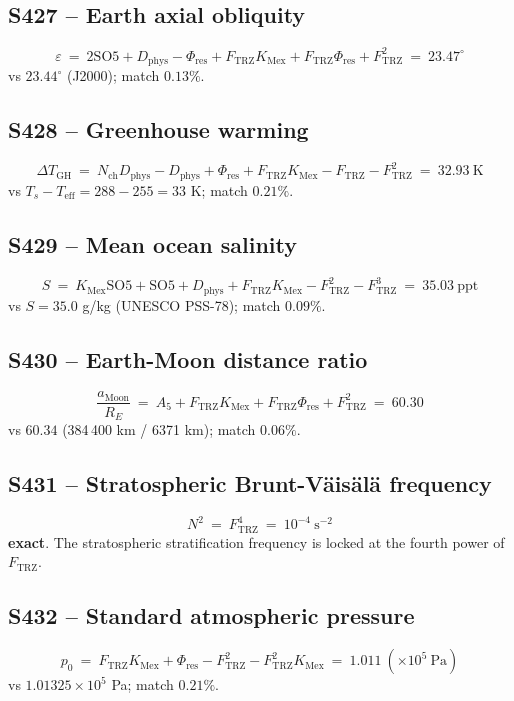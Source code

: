 \documentclass[11pt]{article}
\newcommand{\Ftrz}{F_{\mathrm{TRZ}}}
\newcommand{\Phires}{\Phi_{\mathrm{res}}}
\newcommand{\KMex}{K_{\mathrm{Mex}}}
\newcommand{\Dphys}{D_{\mathrm{phys}}}
\newcommand{\Nch}{N_{\mathrm{ch}}}
\newcommand{\SOfive}{\mathrm{SO5}}
\newcommand{\Afive}{A_{5}}
\begin{document}
\subsection{S427 -- Earth axial obliquity}
\[
\varepsilon\ =\ 2\SOfive+\Dphys-\Phires+\Ftrz\KMex+\Ftrz\Phires+\Ftrz^{2}\ =\ 23.47^{\circ}
\]
vs $23.44^{\circ}$ (J2000); match $0.13\%$.

\subsection{S428 -- Greenhouse warming}
\[
\Delta T_{\mathrm{GH}}\ =\ \Nch\Dphys-\Dphys+\Phires+\Ftrz\KMex-\Ftrz-\Ftrz^{2}\ =\ 32.93\ \text{K}
\]
vs $T_{s}-T_{\mathrm{eff}}=288-255=33$ K; match $0.21\%$.

\subsection{S429 -- Mean ocean salinity}
\[
S\ =\ \KMex\SOfive+\SOfive+\Dphys+\Ftrz\KMex-\Ftrz^{2}-\Ftrz^{3}\ =\ 35.03\ \text{ppt}
\]
vs $S=35.0$ g/kg (UNESCO PSS-78); match $0.09\%$.

\subsection{S430 -- Earth-Moon distance ratio}
\[
\frac{a_{\mathrm{Moon}}}{R_{E}}\ =\ \Afive+\Ftrz\KMex+\Ftrz\Phires+\Ftrz^{2}\ =\ 60.30
\]
vs $60.34$ (384\,400 km / 6371 km); match $0.06\%$.

\subsection{S431 -- Stratospheric Brunt-V\"ais\"al\"a frequency}
\[
N^{2}\ =\ \Ftrz^{4}\ =\ 10^{-4}\ \mathrm{s}^{-2}
\]
\textbf{exact}.  The stratospheric stratification frequency is locked
at the fourth power of $\Ftrz$.

\subsection{S432 -- Standard atmospheric pressure}
\[
p_{0}\ =\ \Ftrz\KMex+\Phires-\Ftrz^{2}-\Ftrz^{2}\KMex\ =\ 1.011\ (\times 10^{5}\ \text{Pa})
\]
vs $1.01325\times 10^{5}$ Pa; match $0.21\%$.
\end{document}
